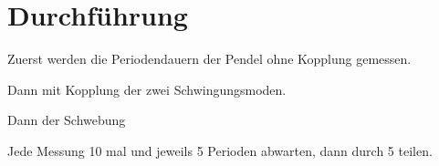 \section{Durchführung}
\FloatBarrier
\label{sec:Durchführung}

Zuerst werden die Periodendauern der Pendel ohne Kopplung gemessen.

Dann mit Kopplung der zwei Schwingungsmoden.

Dann der Schwebung

Jede Messung 10 mal und jeweils 5 Perioden abwarten, dann durch 5 teilen.
